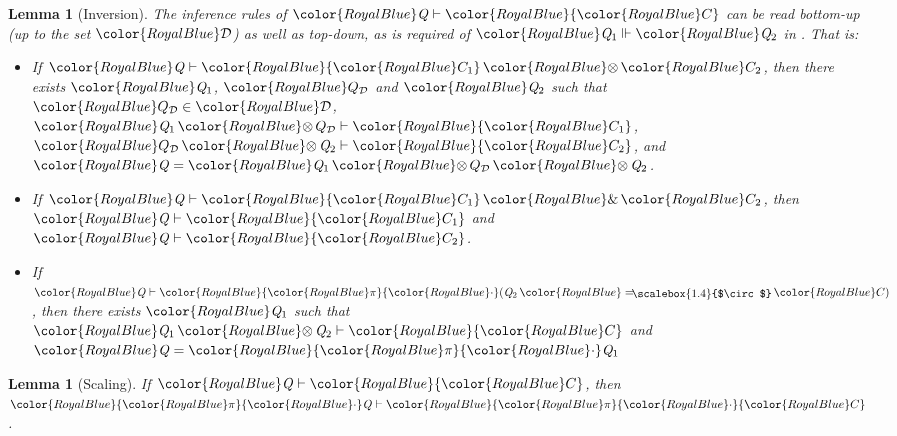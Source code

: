 \documentclass[acmsmall,usenames,dvipsnames,natbib=false,acmthm=false,screen]{acmart}
\newcommand{\constraintcolour}{\color{RoyalBlue}}
\newcommand{\constraintfont}[1]{{\constraintcolour#1}}
\newcommand{\multiplicitycolour}{\color{RoyalBlue}}
\newcommand{\multiplicityfont}[1]{{\multiplicitycolour#1}}
\newcommand{\scale}{\constraintfont{\cdot}}
\newcommand{\constraintop}[1]{\mathop{\constraintfont{#1}}}
\newcommand{\aand}{\constraintop{\&}}
\newcommand{\lollycirc}{\raisebox{-0.255ex}{\scalebox{1.4}{$\circ$}}}
\newcommand{\Lolly}{\constraintop{=\kern-1.1ex \lollycirc}}
\newcommand{\qtensor}{\constraintop{\otimes}}
\theoremstyle{acmplain}
\newtheorem{lemma}[theorem]{Lemma}
\theoremstyle{acmdefinition}
\begin{document}
\begin{lemma}[Inversion]
  \label{lem:inversion}
  The inference rules of $ \constraintfont{ \ottnt{Q} }   \vdash   \constraintfont{ \constraintfont{C} } $ can be read bottom-up (up to the
  set $ \constraintfont{\mathcal{D} } $) as well
  as top-down, as is required of $ \constraintfont{ \ottnt{Q_{{\mathrm{1}}}} }   \Vdash   \constraintfont{ \ottnt{Q_{{\mathrm{2}}}} } $ in
  . That is:
  \begin{itemize}
  \item If $ \constraintfont{ \ottnt{Q} }   \vdash   \constraintfont{ \constraintfont{C_{{\mathrm{1}}}}  \qtensor  \constraintfont{C_{{\mathrm{2}}}} } $, then there exists $  \constraintfont{ \ottnt{Q_{{\mathrm{1}}}} }  $, $  \constraintfont{ Q_{\mathcal{D} } }  $ and $  \constraintfont{ \ottnt{Q_{{\mathrm{2}}}} }  $
    such that $  \constraintfont{ Q_{\mathcal{D} } }   \in  \constraintfont{\mathcal{D} } $, $ \constraintfont{ \ottnt{Q_{{\mathrm{1}}}}  \qtensor  Q_{\mathcal{D} } }   \vdash   \constraintfont{ \constraintfont{C_{{\mathrm{1}}}} } $, $ \constraintfont{ Q_{\mathcal{D} }  \qtensor  \ottnt{Q_{{\mathrm{2}}}} }   \vdash   \constraintfont{ \constraintfont{C_{{\mathrm{2}}}} } $, and
    $  \constraintfont{ \ottnt{Q} }   =   \constraintfont{ \ottnt{Q_{{\mathrm{1}}}}  \qtensor  Q_{\mathcal{D} }  \qtensor  \ottnt{Q_{{\mathrm{2}}}} }  $.
  \item If $ \constraintfont{ \ottnt{Q} }   \vdash   \constraintfont{ \constraintfont{C_{{\mathrm{1}}}}  \aand  \constraintfont{C_{{\mathrm{2}}}} } $, then $ \constraintfont{ \ottnt{Q} }   \vdash   \constraintfont{ \constraintfont{C_{{\mathrm{1}}}} } $ and $ \constraintfont{ \ottnt{Q} }   \vdash   \constraintfont{ \constraintfont{C_{{\mathrm{2}}}} } $.
  \item If $ \constraintfont{ \ottnt{Q} }   \vdash   \constraintfont{   \multiplicityfont{ \pi }  \scale( \ottnt{Q_{{\mathrm{2}}}}  \Lolly  \constraintfont{C} )  } $, then there exists $  \constraintfont{ \ottnt{Q_{{\mathrm{1}}}} }  $ such
    that $ \constraintfont{ \ottnt{Q_{{\mathrm{1}}}}  \qtensor  \ottnt{Q_{{\mathrm{2}}}} }   \vdash   \constraintfont{ \constraintfont{C} } $ and  $  \constraintfont{ \ottnt{Q} }   =   \constraintfont{   \multiplicityfont{ \pi }  \scale \ottnt{Q_{{\mathrm{1}}}}  }  $
  \end{itemize}
\end{lemma}

\begin{lemma}[Scaling]
  \label{lem:wanted:promote}
  If $ \constraintfont{ \ottnt{Q} }   \vdash   \constraintfont{ \constraintfont{C} } $, then $ \constraintfont{   \multiplicityfont{ \pi }  \scale \ottnt{Q}  }   \vdash   \constraintfont{   \multiplicityfont{ \pi }  \scale \constraintfont{C}  } $.
\end{lemma}
\end{document}
